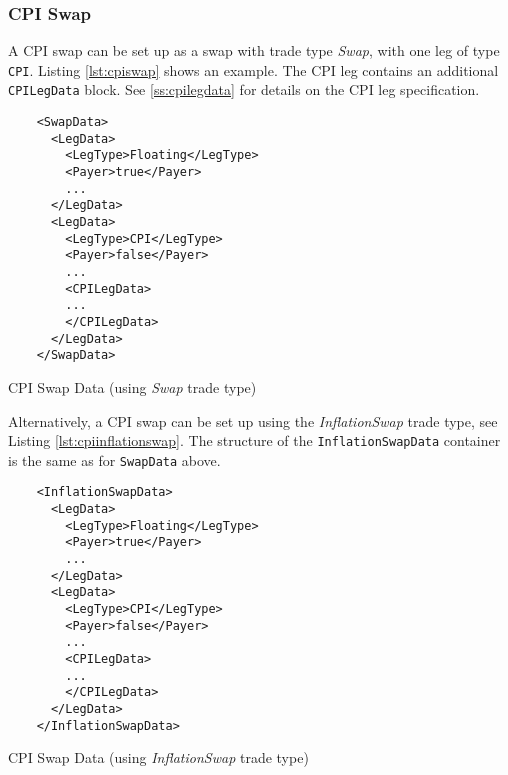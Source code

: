 \subsubsection{CPI Swap}

A CPI swap can be set up as a swap with trade type \emph{Swap}, with one leg of type {\tt CPI}. Listing \ref{lst:cpiswap}
shows an example. The CPI leg contains an additional {\tt CPILegData} block. See \ref{ss:cpilegdata} for details on the
CPI leg specification.

\begin{listing}[H]
\begin{verbatim}
    <SwapData>
      <LegData>
        <LegType>Floating</LegType>
        <Payer>true</Payer>
        ...
      </LegData>
      <LegData>
        <LegType>CPI</LegType>
        <Payer>false</Payer>
        ...
        <CPILegData>
        ...
        </CPILegData>
      </LegData>
    </SwapData>
\end{verbatim}
\caption{CPI Swap Data (using \emph{Swap} trade type)}
\label{lst:cpiswap}
\end{listing}

Alternatively, a CPI swap can be set up using the \emph{InflationSwap} trade type, see Listing \ref{lst:cpiinflationswap}. The structure of the {\tt InflationSwapData} container is the same as for {\tt SwapData} above.

\begin{listing}[H]
\begin{verbatim}
    <InflationSwapData>
      <LegData>
        <LegType>Floating</LegType>
        <Payer>true</Payer>
        ...
      </LegData>
      <LegData>
        <LegType>CPI</LegType>
        <Payer>false</Payer>
        ...
        <CPILegData>
        ...
        </CPILegData>
      </LegData>
    </InflationSwapData>
\end{verbatim}
\caption{CPI Swap Data (using \emph{InflationSwap} trade type)}
\label{lst:cpiinflationswap}
\end{listing}